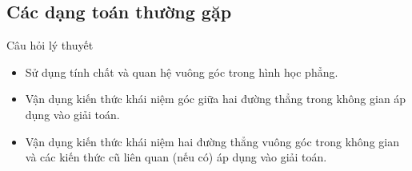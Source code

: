 \subsection{Các dạng toán thường gặp}
\begin{dang}{Câu hỏi lý thuyết}
	\begin{itemize}
		\item Sử dụng tính chất và quan hệ vuông góc trong hình học phẳng.
		\item Vận dụng kiến thức khái niệm góc giữa hai đường thẳng trong không gian áp dụng vào giải toán.
		\item Vận dụng kiến thức khái niệm hai đường thẳng vuông góc trong không gian và các kiến thức cũ liên quan (nếu có) áp dụng vào giải toán.
	\end{itemize}
\end{dang}

